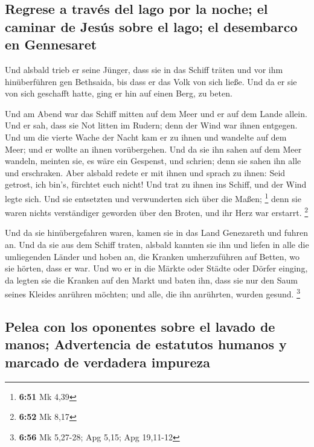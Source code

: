 \hypertarget{regrese-a-travuxe9s-del-lago-por-la-noche-el-caminar-de-jesuxfas-sobre-el-lago-el-desembarco-en-gennesaret}{%
\subsection{Regrese a través del lago por la noche; el caminar de Jesús
sobre el lago; el desembarco en
Gennesaret}\label{regrese-a-travuxe9s-del-lago-por-la-noche-el-caminar-de-jesuxfas-sobre-el-lago-el-desembarco-en-gennesaret}}

 Und alsbald trieb er seine Jünger, dass sie in das
Schiff träten und vor ihm hinüberführen gen Bethsaida, bis dass er das
Volk von sich ließe.  Und da er sie von sich geschafft
hatte, ging er hin auf einen Berg, zu beten.

 Und am Abend war das Schiff mitten auf dem Meer und er
auf dem Lande allein.  Und er sah, dass sie Not litten im
Rudern; denn der Wind war ihnen entgegen. Und um die vierte Wache der
Nacht kam er zu ihnen und wandelte auf dem Meer;  und er
wollte an ihnen vorübergehen. Und da sie ihn sahen auf dem Meer wandeln,
meinten sie, es wäre ein Gespenst, und schrien;  denn sie
sahen ihn alle und erschraken. Aber alsbald redete er mit ihnen und
sprach zu ihnen: Seid getrost, ich bin's, fürchtet euch nicht!
 Und trat zu ihnen ins Schiff, und der Wind legte sich.
Und sie entsetzten und verwunderten sich über die Maßen; \footnote{\textbf{6:51}
  Mk 4,39}  denn sie waren nichts verständiger geworden
über den Broten, und ihr Herz war erstarrt. \footnote{\textbf{6:52} Mk
  8,17}

 Und da sie hinübergefahren waren, kamen sie in das Land
Genezareth und fuhren an.  Und da sie aus dem Schiff
traten, alsbald kannten sie ihn  und liefen in alle die
umliegenden Länder und hoben an, die Kranken umherzuführen auf Betten,
wo sie hörten, dass er war.  Und wo er in die Märkte oder
Städte oder Dörfer einging, da legten sie die Kranken auf den Markt und
baten ihn, dass sie nur den Saum seines Kleides anrühren möchten; und
alle, die ihn anrührten, wurden gesund. \footnote{\textbf{6:56} Mk
  5,27-28; Apg 5,15; Apg 19,11-12}

\hypertarget{pelea-con-los-oponentes-sobre-el-lavado-de-manos-advertencia-de-estatutos-humanos-y-marcado-de-verdadera-impureza}{%
\subsection{Pelea con los oponentes sobre el lavado de manos;
Advertencia de estatutos humanos y marcado de verdadera
impureza}\label{pelea-con-los-oponentes-sobre-el-lavado-de-manos-advertencia-de-estatutos-humanos-y-marcado-de-verdadera-impureza}}

